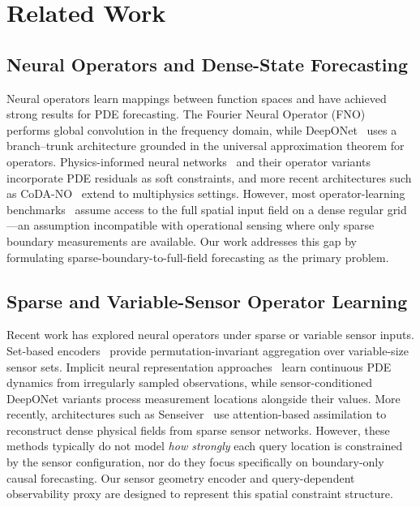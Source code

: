 \documentclass[11pt,a4paper]{article}
\begin{document}
\section{Related Work}

\subsection{Neural Operators and Dense-State Forecasting}

Neural operators learn mappings between function spaces and have achieved strong results for PDE forecasting. The Fourier Neural Operator (FNO)~\cite{li2021fno} performs global convolution in the frequency domain, while DeepONet~\cite{lu2021deeponet} uses a branch--trunk architecture grounded in the universal approximation theorem for operators. Physics-informed neural networks~\cite{raissi2019pinns} and their operator variants~\cite{wang2021pideeponet} incorporate PDE residuals as soft constraints, and more recent architectures such as CoDA-NO~\cite{rahman2024codano} extend to multiphysics settings. However, most operator-learning benchmarks~\cite{takamoto2022pdebench} assume access to the full spatial input field on a dense regular grid---an assumption incompatible with operational sensing where only sparse boundary measurements are available. Our work addresses this gap by formulating sparse-boundary-to-full-field forecasting as the primary problem.

\subsection{Sparse and Variable-Sensor Operator Learning}

Recent work has explored neural operators under sparse or variable sensor inputs. Set-based encoders~\cite{zaheer2017deepsets} provide permutation-invariant aggregation over variable-size sensor sets. Implicit neural representation approaches~\cite{yin2023dino} learn continuous PDE dynamics from irregularly sampled observations, while sensor-conditioned DeepONet variants process measurement locations alongside their values. More recently, architectures such as Senseiver~\cite{santos2023senseiver} use attention-based assimilation to reconstruct dense physical fields from sparse sensor networks. However, these methods typically do not model \emph{how strongly} each query location is constrained by the sensor configuration, nor do they focus specifically on boundary-only causal forecasting. Our sensor geometry encoder and query-dependent observability proxy are designed to represent this spatial constraint structure.
\end{document}
